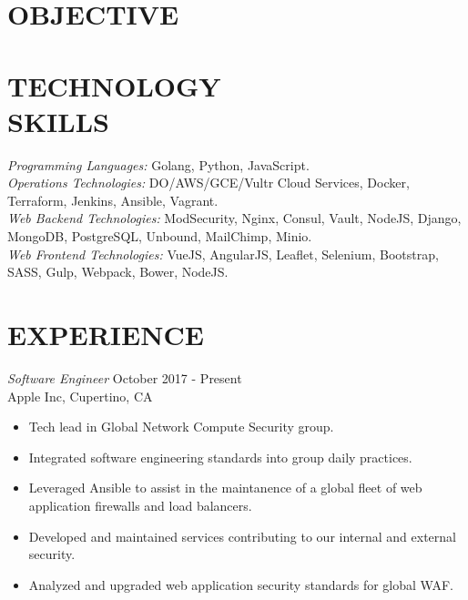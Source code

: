 \documentclass[margin, 10pt]{res} %
\begin{document}
    \begin{resume}


        \section{OBJECTIVE}




        \section{TECHNOLOGY \\ SKILLS}

        {\sl Programming Languages:} Golang, Python, JavaScript. \\
        {\sl Operations Technologies:} DO/AWS/GCE/Vultr Cloud Services, Docker, Terraform, Jenkins, Ansible, Vagrant. \\
        {\sl Web Backend Technologies:} ModSecurity, Nginx, Consul, Vault, NodeJS, Django, MongoDB, PostgreSQL, Unbound, MailChimp, Minio. \\
        {\sl Web Frontend Technologies:} VueJS, AngularJS, Leaflet, Selenium, Bootstrap, SASS, Gulp, Webpack, Bower, NodeJS. \\


        \section{EXPERIENCE}

        {\sl Software Engineer} \hfill October 2017 - Present \\
        Apple Inc, Cupertino, CA
        \begin{itemize}
            \item Tech lead in Global Network Compute Security group.
            \item Integrated software engineering standards into group daily practices.
            \item Leveraged Ansible to assist in the maintanence of a global fleet of web application firewalls and load balancers.
            \item Developed and maintained services contributing to our internal and external security.
            \item Analyzed and upgraded web application security standards for global WAF.
        \end{itemize}


\end{resume}
\end{document}
